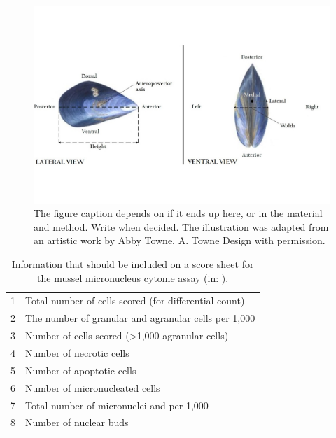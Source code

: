 \begin{figure}[h]
    \centering
    \includegraphics[width=\textwidth]{figures/Anatomy/M_edulis_anatomical_axis_lateral.jpg}
    \caption{The figure caption depends on if it ends up here, or in the material and method. Write when decided. The illustration was adapted from an artistic work by Abby Towne, A. Towne Design with permission.}
    \label{fig:anatomical_axis}
\end{figure}

\begin{table}[H]
	\centering
	\caption{Information that should be included on a score sheet for the mussel micronucleus cytome assay (in: \cite{Bolognesi2012}).}
	\label{tb:MN_Scoring}
	\begin{tabular}{ll}
		\midrule
1  &  Total number of cells scored (for differential count) \\
2  &  The number of granular and agranular cells per 1,000 \\
3  &  Number of cells scored (>1,000 agranular cells) \\
4  &  Number of necrotic cells \\
5  &  Number of apoptotic cells \\
6  &  Number of micronucleated cells \\
7  &  Total number of micronuclei and per 1,000 \\
8  &  Number of nuclear buds \\
		\bottomrule
	\end{tabular}
\end{table}

